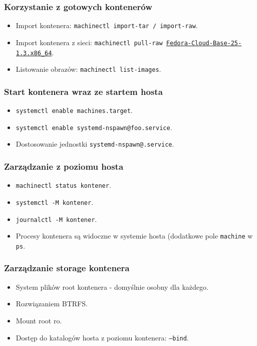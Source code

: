 \documentclass[dvipsnames,table]{beamer}
\begin{document}
\begin{frame}
\frametitle{Korzystanie z gotowych kontenerów}
\begin{itemize}
	\item Import kontenera: {\tt machinectl import-tar / import-raw}.
	\item Import kontenera z sieci: {\tt machinectl pull-raw \href{https://dl.fedoraproject.org/pub/fedora/linux/releases/25/CloudImages/x86\_64/images/Fedora-Cloud-Base-25-1.3.x86\_64.raw.xz}{Fedora-Cloud-Base-25-1.3.x86\_64}}.
	\item Listowanie obrazów: {\tt machinectl list-images}.
\end{itemize}
\end{frame}

\begin{frame}
\frametitle{Start kontenera wraz ze startem hosta}
\begin{itemize}
	\item {\tt systemctl enable machines.target}.
	\item {\tt systemctl enable systemd-nspawn@foo.service}.
	\item Dostosowanie jednostki {\tt systemd-nspawn@.service}.
\end{itemize}
\end{frame}

\begin{frame}
\frametitle{Zarządzanie z poziomu hosta}
\begin{itemize}
	\item {\tt machinectl status kontener}.
	\item {\tt systemctl -M kontener}.
	\item {\tt journalctl -M kontener}.
	\item Procesy kontenera są widoczne w systemie hosta (dodatkowe pole {\tt machine} w {\tt ps}.
\end{itemize}
\end{frame}

\begin{frame}
\frametitle{Zarządzanie storage kontenera}
\begin{itemize}
	\item System plików root kontenera - domyślnie osobny dla każdego.
	\item Rozwiązaniem BTRFS.
	\item Mount root ro.
	\item Dostęp do katalogów hosta z poziomu kontenera: {\tt --bind}.
\end{itemize}
\end{frame}
\end{document}

